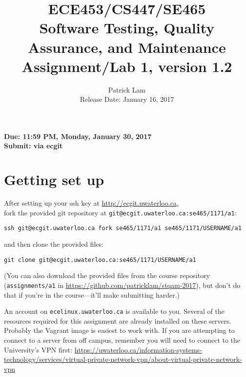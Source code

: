 \documentclass[10pt,hidelinks]{article}
\begin{document}
\title{
ECE453/CS447/SE465 \\
Software Testing, Quality Assurance, and Maintenance\\
Assignment/Lab 1, version 1.2}
\author{Patrick Lam \\
{Release Date:  January 16, 2017} \\
}
\renewcommand{\today}{}
\maketitle

\begin{center}

{\bf Due:  11:59 PM, Monday, January 30, 2017} \\
{\bf Submit: via ecgit }\\
\end{center}



\section*{Getting set up}
After setting up your ssh key at \url{http://ecgit.uwaterloo.ca}, \\ fork the provided git repository at {\tt git@ecgit.uwaterloo.ca:se465/1171/a1}:

\begin{center}
{\tt ssh git@ecgit.uwaterloo.ca fork se465/1171/a1 se465/1171/USERNAME/a1}
\end{center}

\noindent and then clone the provided files:

\begin{center}
{\tt git clone git@ecgit.uwaterloo.ca:se465/1171/USERNAME/a1}
\end{center}

(You can also download the provided
files from the course repository ({\tt assignments/a1} in \url{https://github.com/patricklam/stqam-2017}),
but don't do that if you're in the course---it'll make submitting harder.)

An account on {\tt ecelinux.uwaterloo.ca} is available to you.
Several of the resources required for this assignment are already installed on these servers. Probably the Vagrant image is easiest to work with.
If you are attempting to connect to a server from off campus, remember you will need to connect to the University's VPN first: \url{https://uwaterloo.ca/information-systems-technology/services/virtual-private-network-vpn/about-virtual-private-network-vpn}
\end{document}
